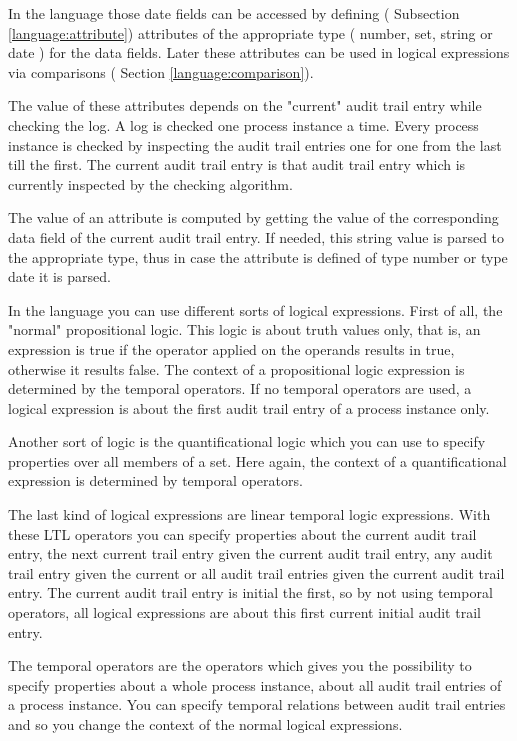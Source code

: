 In the language those date fields can be accessed by defining ( Subsection \ref{language:attribute}) attributes of the appropriate type (
number, set, string or date ) for the data fields. Later these attributes can
be used in logical expressions via comparisons ( Section \ref{language:comparison}). 

The value of these attributes depends on the "current" audit trail entry while
checking the log. A log is checked one process instance a time. Every process
instance is checked by inspecting the audit trail entries one for one from the
last till the first. The current audit trail entry is that audit trail entry
which is currently inspected by the checking algorithm.

The value of an attribute is computed by getting the value of the corresponding data field of
the current audit trail entry. If needed, this string value is parsed to the
appropriate type, thus in case the attribute is defined of type number or type
date it is parsed.

In the language you can use different sorts of logical expressions. First of
all, the "normal" propositional logic. This logic is about truth values only,
that is, an expression is true if the operator applied on the operands results
in true, otherwise it results false. The context of a propositional logic
expression is determined by the temporal operators. If no temporal operators
are used, a logical expression is about the first audit trail entry of a
process instance only.

Another sort of logic is the quantificational logic which you can use to
specify properties over all members of a set. Here again, the context of a
quantificational expression is determined by temporal operators.

The last kind of logical expressions are linear temporal logic expressions.
With these LTL operators you can specify properties about the current audit trail
entry, the next current trail entry given the current audit trail entry, any
audit trail entry given the current or all audit trail entries given the
current audit trail entry. The current audit trail entry is initial the first,
so by not using temporal operators, all logical expressions are about this
first current initial audit trail entry.

The temporal operators are the operators which gives you the possibility to
specify properties about a whole process instance, about all audit trail
entries of a process instance. You can specify temporal relations between
audit trail entries and so you change the context of the normal logical
expressions.

